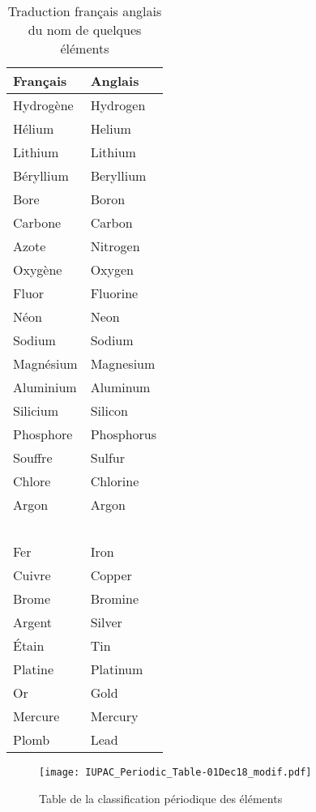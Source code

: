 \begin{table}[h!]
  \centering
  \begin{tabu} to 0.95\linewidth {  X[2,l]  X[l]  }
    \hline
      \textbf{Français} & \textbf{Anglais} \\				      
    \hline
      Hydrogène & Hydrogen \\  
      Hélium 	& Helium \\
      Lithium	& Lithium \\
      Béryllium & Beryllium \\
      Bore	& Boron \\
      Carbone	& Carbon \\
      Azote	& Nitrogen \\
      Oxygène	& Oxygen \\
      Fluor 	& Fluorine \\
      Néon	& Neon \\
      Sodium 	& Sodium\\
      Magnésium & Magnesium\\
      Aluminium & Aluminum \\
      Silicium 	& Silicon \\
      Phosphore & Phosphorus \\
      Souffre	& Sulfur \\
      Chlore	& Chlorine \\
      Argon	& Argon \\
      ~ & ~\\
      Fer	& Iron \\
      Cuivre	& Copper \\
      Brome	& Bromine \\
      Argent	& Silver \\
      Étain	& Tin \\
      Platine	& Platinum\\
      Or	& Gold \\
      Mercure 	& Mercury \\
      Plomb	& Lead \\
    \hline
  \end{tabu}
  \caption{Traduction français anglais du nom de quelques éléments}
  \label{tab:traduction-nom-elements}
\end{table}

\begin{figure*}[h]
  \begin{center}
      \texttt{[image: IUPAC\_Periodic\_Table-01Dec18\_modif.pdf]}
  \end{center}  
  \caption{Table de la classification périodique des éléments}
  \label{table_IUPAC_classification}
\end{figure*}
